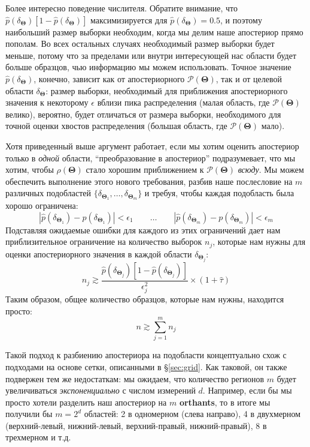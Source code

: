 \documentclass[12pt, titlepage]{article}
\newcommand{\params}{\ensuremath{\boldsymbol\Theta}}
\newcommand{\posterior}{\ensuremath{\mathcal{P}}}
\begin{document}
Более интересно поведение числителя. Обратите внимание, что $\hat{p}(\delta_{\params}) \left[1 - \hat{p}(\delta_{\params})\right]$ максимизируется для $\hat{p}(\delta_{\params}) = 0.5$, и поэтому наибольший размер выборки необходим, когда мы делим наше апостериор прямо пополам. Во всех остальных случаях необходимый размер выборки будет меньше, потому что за пределами или внутри интересующей нас области будет больше образцов, чью информацию мы можем использовать. Точное значение $\hat{p}(\delta_{\params})$, конечно, зависит как от апостериорного $\posterior(\params)$, так и от целевой области $\delta_{\params}$: размер выборки, необходимый для приближения апостериорного значения к некоторому $\epsilon$ вблизи пика распределения (малая область, где $\posterior(\params)$ велико), вероятно, будет отличаться от размера выборки, необходимого для точной оценки хвостов распределения (большая область, где $\posterior(\params)$ мало).

Хотя приведенный выше аргумент работает, если мы хотим оценить апостериор только в \textit{одной} области, ``преобразование в апостериор'' подразумевает, что мы хотим, чтобы $\rho(\params)$ стало хорошим приближением к $\posterior(\params)$ \textit{всюду}. Мы можем обеспечить выполнение этого нового требования, разбив наше послесловие на $m$ различных подобластей $\{ \delta_{\params_1}, \dots, \delta_{\params_m} \}$ и требуя, чтобы каждая подобласть была хорошо ограничена:
\begin{equation}
    |\hat{p}(\delta_{\params_1}) - p(\delta_{\params_1})| < \epsilon_1
    \quad\quad \dots \quad\quad
    |\hat{p}(\delta_{\params_m}) - p(\delta_{\params_m})| < \epsilon_m
\end{equation}
Подставляя ожидаемые ошибки для каждого из этих ограничений дает нам приблизительное ограничение на количество выборок $n_j$, которые нам нужны для оценки апостериорного значения в каждой области $\delta_{\params_j}$:
\begin{equation}
    n_j \gtrsim \frac{\hat{p}(\delta_{\params_j}) 
    \left[1 - \hat{p}(\delta_{\params_j})\right]}
    {\epsilon_j^2} \times (1+\hat{\tau})
\end{equation}
Таким образом, общее количество образцов, которые нам нужны, находится просто:
\begin{equation}
    n \gtrsim 
    \sum_{j=1}^{m} n_j
\end{equation}

Такой подход к разбиению апостериора на подобласти концептуально схож с подходами на основе сетки, описанными в \S\ref{sec:grid}. Как таковой, он также подвержен тем же недостаткам: мы ожидаем, что количество регионов $m$ будет увеличиваться \textit{экспоненциально} с числом измерений $d$. Например, если бы мы просто хотели разделить наш апостериор на $m$ \textbf{orthants}, то в итоге мы получили бы $m=2^d$ областей: 2 в одномерном (слева направо), 4 в двухмерном (верхний-левый, нижний-левый, верхний-правый, нижний-правый), 8 в трехмерном и т.д.
\end{document}
